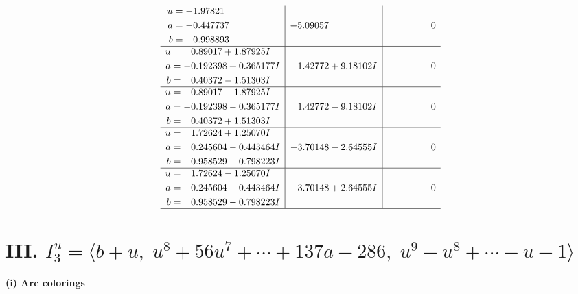 \documentclass[1p]{elsarticle_modified}
\theoremstyle{definition}
\begin{document}
$$\begin{array}{c|c|c}
\begin{aligned}
u &= -1.97821\phantom{ +0.000000I} \\
a &= -0.447737\phantom{ +0.000000I} \\
b &= -0.998893\phantom{ +0.000000I}\end{aligned}
 & -5.09057\phantom{ +0.000000I} & \phantom{-0.000000 } 0 \\ \hline\begin{aligned}
u &= \phantom{-}0.89017 + 1.87925 I \\
a &= -0.192398 + 0.365177 I \\
b &= \phantom{-}0.40372 - 1.51303 I\end{aligned}
 & \phantom{-}1.42772 + 9.18102 I & \phantom{-0.000000 } 0 \\ \hline\begin{aligned}
u &= \phantom{-}0.89017 - 1.87925 I \\
a &= -0.192398 - 0.365177 I \\
b &= \phantom{-}0.40372 + 1.51303 I\end{aligned}
 & \phantom{-}1.42772 - 9.18102 I & \phantom{-0.000000 } 0 \\ \hline\begin{aligned}
u &= \phantom{-}1.72624 + 1.25070 I \\
a &= \phantom{-}0.245604 - 0.443464 I \\
b &= \phantom{-}0.958529 + 0.798223 I\end{aligned}
 & -3.70148 - 2.64555 I & \phantom{-0.000000 } 0 \\ \hline\begin{aligned}
u &= \phantom{-}1.72624 - 1.25070 I \\
a &= \phantom{-}0.245604 + 0.443464 I \\
b &= \phantom{-}0.958529 - 0.798223 I\end{aligned}
 & -3.70148 + 2.64555 I & \phantom{-0.000000 } 0\\
 \hline 
 \end{array}$$\newpage\newpage\renewcommand{\arraystretch}{1}
\centering \section*{III. $I^u_{3}= \langle b+u,\;u^8+56 u^7+\cdots+137 a-286,\;u^9- u^8+\cdots- u-1 \rangle$}
\flushleft \textbf{(i) Arc colorings}\\
\end{document}
